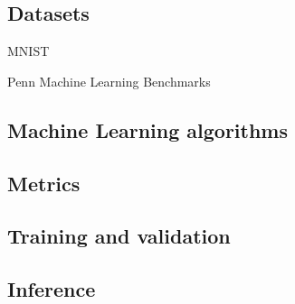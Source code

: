 \subsection{Datasets}
MNIST \parencite{dengMNISTDatabaseHandwritten2012}

Penn Machine Learning Benchmarks \parencite{olsonPMLBLargeBenchmark2017}




\subsection{Machine Learning algorithms}
\subsection{Metrics}
\subsection{Training and validation}
\subsection{Inference}

